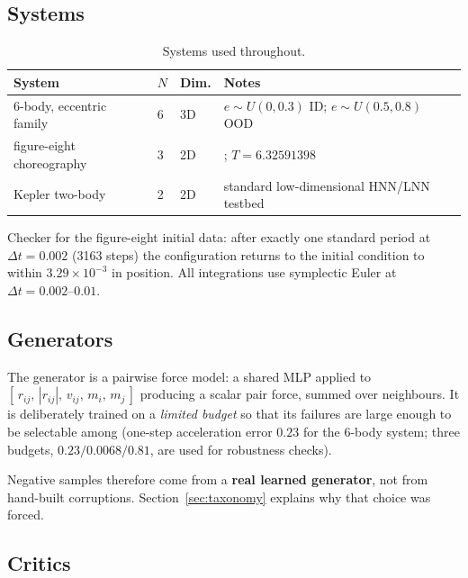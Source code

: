 \documentclass[11pt]{article}
\begin{document}
\subsection{Systems}

\begin{table}[t]
\centering
\small
\caption{Systems used throughout.}
\label{tab:systems}
\begin{tabular}{llll}
\toprule
System & $N$ & Dim. & Notes \\
\midrule
6-body, eccentric family & 6 & 3D & $e\sim U(0,0.3)$ ID; $e\sim U(0.5,0.8)$ OOD \\
figure-eight choreography & 3 & 2D & \cite{chenciner2000}; $T=6.32591398$ \\
Kepler two-body & 2 & 2D & standard low-dimensional HNN/LNN testbed \\
\bottomrule
\end{tabular}
\end{table}

Checker for the figure-eight initial data: after exactly one standard period at
$\Delta t = 0.002$ (3163 steps) the configuration returns to the initial condition to
within $3.29\times10^{-3}$ in position. All integrations use symplectic Euler at
$\Delta t = 0.002$--$0.01$.

\subsection{Generators}

The generator is a pairwise force model: a shared MLP applied to
$[\,r_{ij},\,|r_{ij}|,\,v_{ij},\,m_i,\,m_j\,]$ producing a scalar pair force, summed
over neighbours. It is deliberately trained on a \emph{limited budget} so that its
failures are large enough to be selectable among (one-step acceleration error $0.23$
for the 6-body system; three budgets, $0.23/0.0068/0.81$, are used for robustness
checks).

Negative samples therefore come from a \textbf{real learned generator}, not from
hand-built corruptions. Section~\ref{sec:taxonomy} explains why that choice was forced.

\subsection{Critics}
\end{document}
